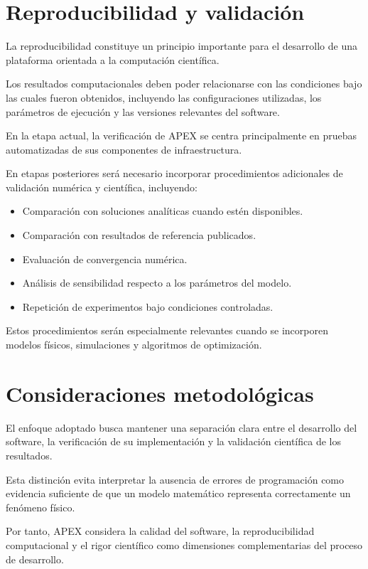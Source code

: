 \section{Reproducibilidad y validación}

La reproducibilidad constituye un principio importante
para el desarrollo de una plataforma orientada a la
computación científica.

Los resultados computacionales deben poder relacionarse
con las condiciones bajo las cuales fueron obtenidos,
incluyendo las configuraciones utilizadas, los parámetros
de ejecución y las versiones relevantes del software.

En la etapa actual, la verificación de APEX se centra
principalmente en pruebas automatizadas de sus componentes
de infraestructura.

En etapas posteriores será necesario incorporar
procedimientos adicionales de validación numérica
y científica, incluyendo:

\begin{itemize}
    \item Comparación con soluciones analíticas cuando
    estén disponibles.
    \item Comparación con resultados de referencia
    publicados.
    \item Evaluación de convergencia numérica.
    \item Análisis de sensibilidad respecto a los parámetros
    del modelo.
    \item Repetición de experimentos bajo condiciones
    controladas.
\end{itemize}

Estos procedimientos serán especialmente relevantes
cuando se incorporen modelos físicos, simulaciones
y algoritmos de optimización.

\section{Consideraciones metodológicas}

El enfoque adoptado busca mantener una separación clara
entre el desarrollo del software, la verificación de su
implementación y la validación científica de los resultados.

Esta distinción evita interpretar la ausencia de errores
de programación como evidencia suficiente de que un modelo
matemático representa correctamente un fenómeno físico.

Por tanto, APEX considera la calidad del software,
la reproducibilidad computacional y el rigor científico
como dimensiones complementarias del proceso de desarrollo.
